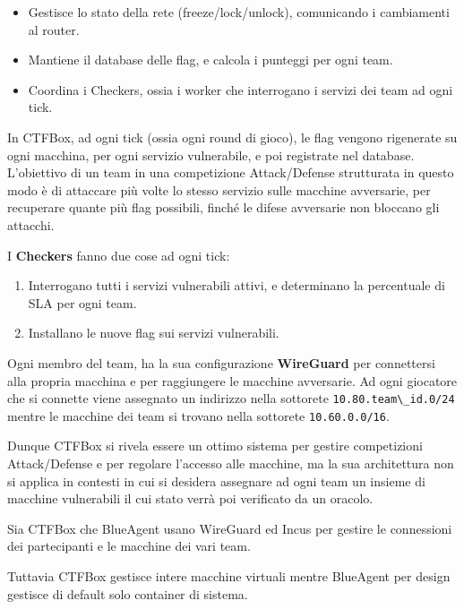 \begin{itemize}
\tightlist
\item
  Gestisce lo stato della rete (freeze/lock/unlock), comunicando i
  cambiamenti al router.
\item
  Mantiene il database delle flag, e calcola i punteggi per ogni team.
\item
  Coordina i Checkers, ossia i worker che interrogano i servizi dei team
  ad ogni tick.
\end{itemize}

In CTFBox, ad ogni tick (ossia ogni round di gioco), le flag vengono
rigenerate su ogni macchina, per ogni servizio vulnerabile, e poi
registrate nel database. L'obiettivo di un team in una competizione
Attack/Defense strutturata in questo modo è di attaccare più volte lo
stesso servizio sulle macchine avversarie, per recuperare quante più
flag possibili, finché le difese avversarie non bloccano gli attacchi.

I \textbf{Checkers} fanno due cose ad ogni tick:

\begin{enumerate}
\def\labelenumi{\arabic{enumi}.}
\tightlist
\item
  Interrogano tutti i servizi vulnerabili attivi, e determinano la
  percentuale di SLA per ogni team.
\item
  Installano le nuove flag sui servizi vulnerabili.
\end{enumerate}

Ogni membro del team, ha la sua configurazione \textbf{WireGuard} per
connettersi alla propria macchina e per raggiungere le macchine
avversarie. Ad ogni giocatore che si connette viene assegnato un
indirizzo nella sottorete \passthrough{\lstinline!10.80.team\_id.0/24!}
mentre le macchine dei team si trovano nella sottorete
\passthrough{\lstinline!10.60.0.0/16!}.

Dunque CTFBox si rivela essere un ottimo sistema per gestire
competizioni Attack/Defense e per regolare l'accesso alle macchine, ma
la sua architettura non si applica in contesti in cui si desidera
assegnare ad ogni team un insieme di macchine vulnerabili il cui stato
verrà poi verificato da un oracolo.

Sia CTFBox che BlueAgent usano WireGuard ed Incus per gestire le
connessioni dei partecipanti e le macchine dei vari team.

Tuttavia CTFBox gestisce intere macchine virtuali mentre BlueAgent per
design gestisce di default solo container di sistema.

